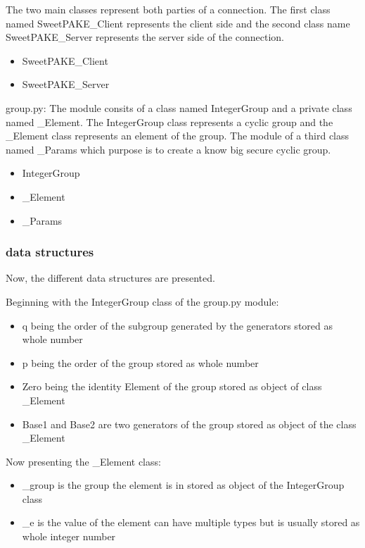 \documentclass[../main.tex]{subfiles}
\begin{document}
The two main classes represent both parties of a connection. The first class
named SweetPAKE\_Client represents the client side and the second class name
SweetPAKE\_Server represents the server side of the connection.

\begin{itemize}
	\item SweetPAKE\_Client
	\item SweetPAKE\_Server
\end{itemize}

group.py: The module consits of a class named IntegerGroup and a private class
named \_Element. The IntegerGroup class represents a cyclic group and the
\_Element class represents an element of the group. The module of a third class
named \_Params which purpose is to create a know big secure cyclic group.

\begin{itemize}
	\item IntegerGroup
	\item \_Element
	\item \_Params
\end{itemize}

\subsubsection{data structures}
Now, the different data structures are presented.

Beginning with the IntegerGroup class of the group.py module:
\begin{itemize}
	\item q being the order of the subgroup generated by the generators stored as whole number
	\item p being the order of the group stored as whole number
	\item Zero being the identity Element of the group stored as object of class \_Element 
	\item Base1 and Base2 are two generators of the group
		stored as object of the class \_Element
\end{itemize}

Now presenting the \_Element class:
\begin{itemize}
	\item \_group is the group the element is in stored as object of the
		IntegerGroup class 
        \item \_e is the value of the element can have
		multiple types but is usually stored as whole integer number
\end{itemize}
\end{document}
